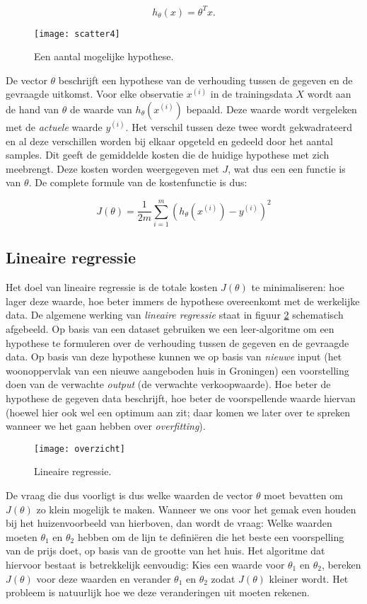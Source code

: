 \[
h_\theta(x) = \theta^Tx.
\]

\begin{figure}[h]
\centering
\texttt{[image: scatter4]}
\caption{Een aantal mogelijke hypothese.\label{img:scatter4}}
\end{figure}

De vector $\theta$ beschrijft een hypothese van de verhouding tussen de gegeven en de gevraagde uitkomst. Voor elke observatie $x^{(i)}$ in de trainingsdata $X$ wordt aan de hand van $\theta$ de waarde van $h_\theta(x^{(i)})$ bepaald. Deze waarde wordt vergeleken met de \textit{actuele} waarde $y^{(i)}$. Het verschil tussen deze twee wordt gekwadrateerd en al deze verschillen worden bij elkaar opgeteld en gedeeld door het aantal samples. Dit geeft de gemiddelde kosten die de huidige hypothese met zich meebrengt. Deze kosten worden weergegeven met $J$, wat dus een een functie is van $\theta$. De complete formule van de kostenfunctie is dus:

\[
J(\theta) = \frac{1}{2m}\sum_{i=1}^m(h_\theta(x^{(i)})-y^{(i)})^2
\]


\subsection{Lineaire regressie}

Het doel van lineaire regressie is de totale kosten $J(\theta)$ te minimaliseren: hoe lager deze waarde, hoe beter immers de hypothese overeenkomt met de werkelijke data. De algemene werking van \textit{lineaire regressie} staat in figuur \ref{img:overzicht} schematisch afgebeeld. Op basis van een dataset gebruiken we een leer-algoritme om een hypothese te formuleren over de verhouding tussen de gegeven en de gevraagde data. Op basis van deze hypothese kunnen we op basis van \textit{nieuwe} input (het woonoppervlak van een nieuwe aangeboden huis in Groningen) een voorstelling doen van de verwachte \textit{output} (de verwachte verkoopwaarde). Hoe beter de hypothese de gegeven data beschrijft, hoe beter de voorspellende waarde hiervan (hoewel hier ook wel een optimum aan zit; daar komen we later over te spreken wanneer we het gaan hebben over \textit{overfitting}).

\begin{figure}[h]
\centering
\texttt{[image: overzicht]}
\caption{Lineaire regressie.\label{img:overzicht}}
\end{figure}

De vraag die dus voorligt is dus welke waarden de vector $\theta$ moet bevatten om $J(\theta)$ zo klein mogelijk te maken. Wanneer we ons voor het gemak even houden bij het huizenvoorbeeld van hierboven, dan wordt de vraag: Welke waarden moeten $\theta_1$ en $\theta_2$ hebben om de lijn te definiëren die het beste een voorspelling van de prijs doet, op basis van de grootte van het huis. Het algoritme dat hiervoor bestaat is betrekkelijk eenvoudig: Kies een waarde voor $\theta_1$ en $\theta_2$, bereken $J(\theta)$ voor deze waarden en verander $\theta_1$ en $\theta_2$ zodat $J(\theta)$ kleiner wordt. Het probleem is natuurlijk hoe we deze veranderingen uit moeten rekenen.

